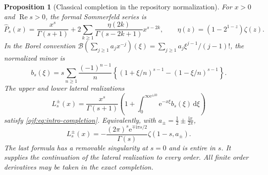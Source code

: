 \documentclass[11pt,a4paper]{article}
\numberwithin{equation}{section}
\newtheorem{proposition}[theorem]{Proposition}
\theoremstyle{definition}\newtheorem{definition}[theorem]{Definition}
\theoremstyle{remark}\newtheorem{remark}[theorem]{Remark}
\newcommand{\ee}{\mathrm e}\newcommand{\ii}{\mathrm i}\newcommand{\dd}{\,\mathrm d}
\newcommand{\Rea}{\operatorname{Re}}\newcommand{\Ima}{\operatorname{Im}}
\newcommand{\B}{\mathcal B}\newcommand{\calF}{\mathcal F}\newcommand{\calL}{\mathcal L}
\begin{document}
\begin{proposition}[Classical completion in the repository normalization]
\label{ojf:prop:completion}
For $x>0$ and $\Rea s>0$, the formal Sommerfeld series is
\begin{equation}\label{ojf:eq:sommerfeld}
 \widehat P_s(x)=\frac{x^s}{\Gamma(s+1)}+
       2\sum_{k\ge1}\frac{\eta(2k)}{\Gamma(s-2k+1)}x^{s-2k},
 \qquad \eta(z)=(1-2^{1-z})\zeta(z).
\end{equation}
In the Borel convention
$\B(\sum_{j\ge1}a_jx^{-j})(\xi)=
 \sum_{j\ge1}a_j\xi^{j-1}/(j-1)!$,
the normalized minor is
\begin{equation}\label{ojf:eq:lattice}
 b_s(\xi)=s\sum_{n\ge1}\frac{(-1)^{n-1}}n
 \left\{(1+\xi/n)^{s-1}-(1-\xi/n)^{s-1}\right\}.
\end{equation}
The upper and lower lateral realizations
\begin{equation}\label{ojf:eq:lateral-borel}
 L_s^\pm(x)=\frac{x^s}{\Gamma(s+1)}
       \left(1+\int_{0}^{\infty\ee^{\pm\ii0}}
                      \ee^{-x\xi}b_s(\xi)\dd\xi\right)
\end{equation}
satisfy \eqref{ojf:eq:intro-completion}. Equivalently, with
$a_\pm=\frac12\pm\frac{\ii x}{2\pi}$,
\begin{equation}\label{ojf:eq:hurwitz-completion}
 L_s^\pm(x)=-\frac{(2\pi)^s\ee^{\mp\ii\pi s/2}}{\Gamma(s)}
                     \zeta(1-s,a_\pm).
\end{equation}
The last formula has a removable singularity at $s=0$ and is entire in
$s$. It supplies the continuation of the lateral realization to every
order. All finite order derivatives may be taken in the exact completion.
\end{proposition}
\end{document}
